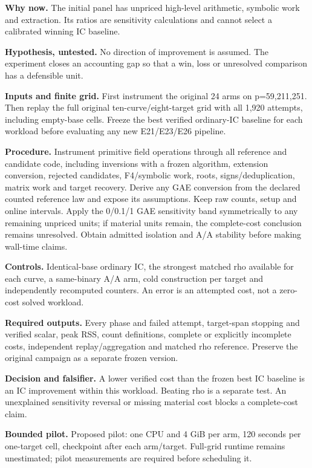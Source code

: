 \documentclass[
  10pt,
]{article}
\begin{document}
\textbf{Why now.} The initial panel has unpriced high-level arithmetic,
symbolic work and extraction. Its ratios are sensitivity calculations
and cannot select a calibrated winning IC baseline.

\textbf{Hypothesis, untested.} No direction of improvement is assumed.
The experiment closes an accounting gap so that a win, loss or
unresolved comparison has a defensible unit.

\textbf{Inputs and finite grid.} First instrument the original 24 arms
on p=59,211,251. Then replay the full original ten-curve/eight-target
grid with all 1,920 attempts, including empty-base cells. Freeze the
best verified ordinary-IC baseline for each workload before evaluating
any new E21/E23/E26 pipeline.

\textbf{Procedure.} Instrument primitive field operations through all
reference and candidate code, including inversions with a frozen
algorithm, extension conversion, rejected candidates, F4/symbolic work,
roots, signs/deduplication, matrix work and target recovery. Derive any
GAE conversion from the declared counted reference law and expose its
assumptions. Keep raw counts, setup and online intervals. Apply the
0/0.1/1 GAE sensitivity band symmetrically to any remaining unpriced
units; if material units remain, the complete-cost conclusion remains
unresolved. Obtain admitted isolation and A/A stability before making
wall-time claims.

\textbf{Controls.} Identical-base ordinary IC, the strongest matched rho
available for each curve, a same-binary A/A arm, cold construction per
target and independently recomputed counters. An error is an attempted
cost, not a zero-cost solved workload.

\textbf{Required outputs.} Every phase and failed attempt, target-span
stopping and verified scalar, peak RSS, count definitions, complete or
explicitly incomplete costs, independent replay/aggregation and matched
rho reference. Preserve the original campaign as a separate frozen
version.

\textbf{Decision and falsifier.} A lower verified cost than the frozen
best IC baseline is an IC improvement within this workload. Beating rho
is a separate test. An unexplained sensitivity reversal or missing
material cost blocks a complete-cost claim.

\textbf{Bounded pilot.} Proposed pilot: one CPU and 4 GiB per arm, 120
seconds per one-target cell, checkpoint after each arm/target. Full-grid
runtime remains unestimated; pilot measurements are required before
scheduling it.
\end{document}
